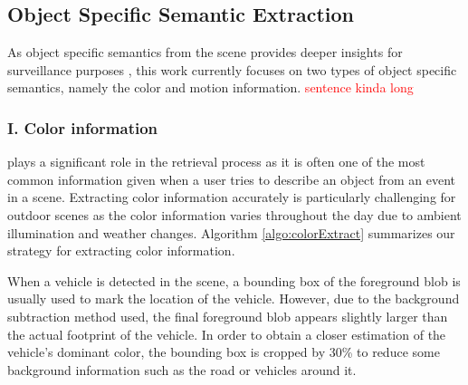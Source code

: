\documentclass[runningheads]{llncs}
\newcommand{\ian}[1]{\textcolor{red}{#1}}
\newcommand{\ian}[1]{}   %
\begin{document}
 
\subsection{Object Specific Semantic Extraction}
As object specific semantics from the scene provides deeper insights for surveillance purposes%
, this work currently focuses on two types of object specific semantics,  
namely the color and motion information. \ian{sentence kinda long}

\subsubsection{I. Color information} plays a significant role in the retrieval process as it is often one of the most common information given when a user tries to describe an object from an event in a scene. Extracting color information accurately is particularly challenging %
for outdoor scenes as the color information varies throughout the day due to ambient illumination and weather changes. Algorithm \ref{algo:colorExtract} summarizes our strategy for extracting color information.

When a vehicle is detected in the scene, a bounding box of the foreground blob is usually used to mark the location of the vehicle. However, due to the background subtraction method used, the final foreground blob appears slightly larger than the actual footprint of the vehicle. In order to obtain a closer estimation of the vehicle's dominant color, the bounding box is cropped by 30\% to reduce some background information such as the road or vehicles around it. %
\end{document}
